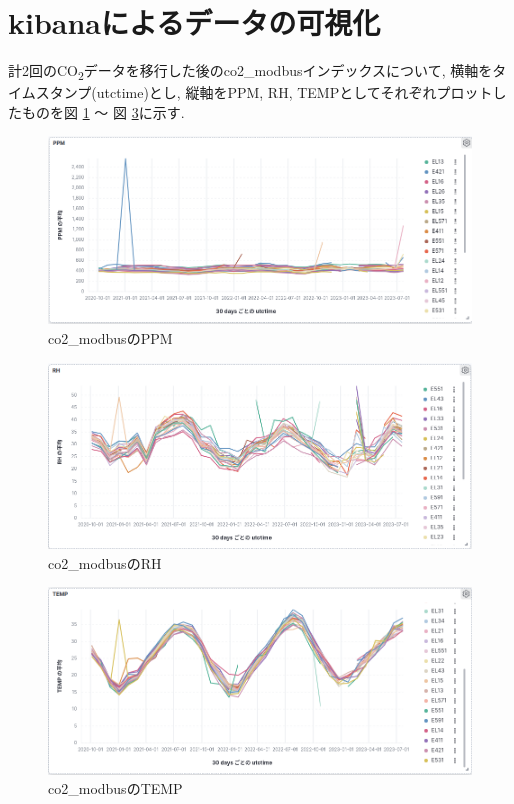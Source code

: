 \section{kibanaによるデータの可視化}

計2回のCO\textsubscript{2}データを移行した後のco2\_modbusインデックスについて, 横軸をタイムスタンプ(utctime)とし, 縦軸をPPM, RH, TEMPとしてそれぞれプロットしたものを図 \ref{p12} 〜 図 \ref{p14}に示す.

\begin{figure}[!ht]
    \begin{center}
        \includegraphics[width=160mm]{sotu/figure/ppm.png}
        \caption{co2\_modbusのPPM}
        \label{p12}
    \end{center}
\end{figure}

\begin{figure}[!ht]
    \begin{center}
        \includegraphics[width=160mm]{sotu/figure/rh.png}
        \caption{co2\_modbusのRH}
        \label{p13}
    \end{center}
\end{figure}

\begin{figure}[!ht]
    \begin{center}
        \includegraphics[width=160mm]{sotu/figure/temp.png}
        \caption{co2\_modbusのTEMP}
        \label{p14}
    \end{center}
\end{figure}

